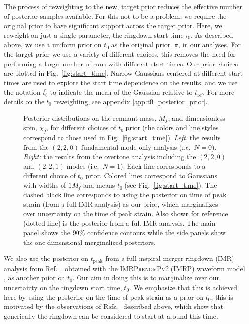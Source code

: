 The process of reweighting to the new, target prior reduces the effective number of posterior samples available.
For this not to be a problem, we require the original prior to have significant support across the target prior.
Here, we reweight on just a single parameter, the ringdown start time $t_0$.
As described above, we use a uniform prior on $t_0$ as the original prior, $\pi$, in our analyses.
For the target prior we use a variety of different choices, this removes the need for performing a large number of runs with different start times. 
Our prior choices are plotted in Fig.~\ref{fig:start_time}.
Narrow Gaussians centered at different start times are used to explore the start time dependence on the results, and we use the notation $\bar{t_0}$ to indicate the mean of the Gaussian relative to $t_\mathrm{ref}$. 
For more details on the $t_0$ reweighting, see appendix \ref{app:t0_posterior_prior}.

\begin{figure*}[t]
	\captionsetup[subfigure]{labelformat=empty}
	\centering
	\;
	\;
	\caption[Posterior distributions on GW150914's remnant mass and dimensionless spin for different choices of $t_0$ prior]{  
		Posterior distributions on the remnant mass, $M_f$, and dimensionless spin, $\chi_f$, for different choices of $t_0$ prior (the colors and line styles correspond to those used in Fig.~\ref{fig:start_time}). 
		\emph{Left:} the results from the $(2,2,0)$ fundamental-mode-only analysis (i.e.\ $N=0$).
		\emph{Right:} the results from the overtone analysis including the $(2,2,0)$ and $(2,2,1)$ modes (i.e.\ $N=1$).
		Each line corresponds to a different choice of $t_0$ prior. 
		Colored lines correspond to Gaussians with widths of $1 \tilde{M_f}$ and means $\bar{t_0}$ (see Fig.~\ref{fig:start_time}).
		The dashed black line corresponds to using the posterior on time of peak strain (from a full IMR analysis) as our prior, which marginalizes over uncertainty on the time of peak strain.
		Also shown for reference (dotted line) is the posterior from a full IMR analysis. 
		The main panel shows the 90\% confidence contours while the side panels show the one-dimensional marginalized posteriors.
	}
	\label{fig:mass_spin_post}
\end{figure*}

We also use the posterior on $t_\mathrm{peak}$ from a full inspiral-merger-ringdown (IMR) analysis from Ref.~\cite{Isi:2022mhy}, obtained with the \textsc{IMRPhenomPv2} (IMRP) waveform model \cite{Hannam:2013oca}, as another prior on $t_0$. 
Our aim in doing this is to marginalize over our uncertainty on the ringdown start time, $t_0$. 
We emphasize that this is achieved here by using the posterior on the time of peak strain as a prior on $t_0$; this is motivated by the observations of Refs.~\cite{Giesler:2019uxc, Bhagwat:2019dtm, Ota:2019bzl, Cook:2020otn, JimenezForteza:2020cve, Dhani:2020nik, Finch:2021iip, Forteza:2021wfq, Dhani:2021vac, MaganaZertuche:2021syq} described above, which show that generically the ringdown can be considered to start at around this time.


